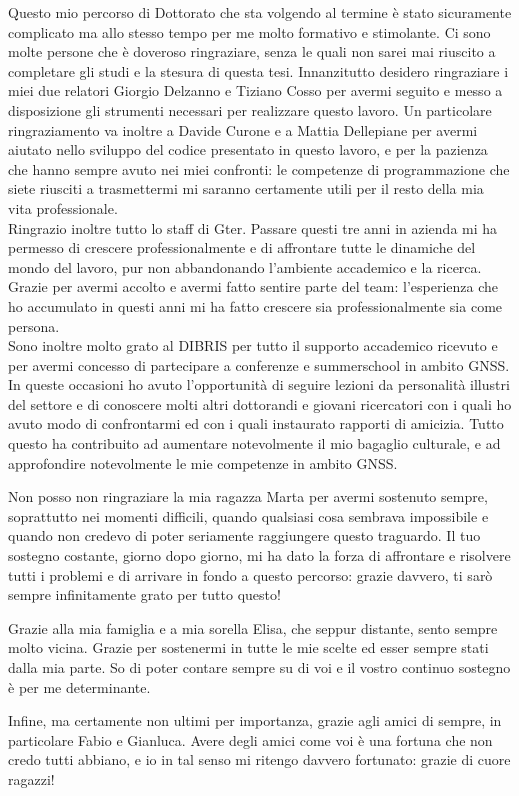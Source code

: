 \documentclass{disithesis}
\begin{document}
\begin{acknowledgements}
Questo mio percorso di Dottorato che sta volgendo al termine è stato sicuramente complicato ma allo stesso tempo per me molto formativo e stimolante. Ci sono molte persone che è doveroso ringraziare, senza le quali non sarei mai riuscito a completare gli studi e la stesura di questa tesi. Innanzitutto desidero ringraziare i miei due relatori Giorgio Delzanno e Tiziano Cosso per avermi seguito e messo a disposizione gli strumenti necessari per realizzare questo lavoro. Un particolare ringraziamento va inoltre a Davide Curone e a Mattia Dellepiane per avermi aiutato nello sviluppo del codice presentato in questo lavoro, e per la pazienza che hanno sempre avuto nei miei confronti: le competenze di programmazione che siete riusciti a trasmettermi mi saranno certamente utili per il resto della mia vita professionale.\\
Ringrazio inoltre tutto lo staff di Gter. Passare questi tre anni in azienda mi ha permesso di crescere professionalmente e di affrontare tutte le dinamiche del mondo del lavoro, pur non abbandonando l'ambiente accademico e la ricerca. Grazie per avermi accolto e avermi fatto sentire parte del team: l'esperienza che ho accumulato in questi anni mi ha fatto crescere sia professionalmente sia come persona. \\
Sono inoltre molto grato al DIBRIS per tutto il supporto accademico ricevuto e per avermi concesso di partecipare a conferenze e summerschool in ambito GNSS. In queste occasioni ho avuto l'opportunità di seguire lezioni da personalità illustri del settore e di conoscere molti altri dottorandi e giovani ricercatori con i quali ho avuto modo di confrontarmi ed con i quali instaurato rapporti di amicizia. Tutto questo ha contribuito ad aumentare notevolmente il mio bagaglio culturale, e ad approfondire notevolmente le mie competenze in ambito GNSS.

Non posso non ringraziare la mia ragazza Marta per avermi sostenuto sempre, soprattutto nei momenti difficili, quando qualsiasi cosa sembrava impossibile e quando non credevo di poter seriamente raggiungere questo traguardo. Il tuo sostegno costante, giorno dopo giorno, mi ha dato la forza di affrontare e risolvere tutti i problemi e di arrivare in fondo a questo percorso: grazie davvero, ti sarò sempre infinitamente grato per tutto questo! 

Grazie alla mia famiglia e a mia sorella Elisa, che seppur distante, sento sempre molto vicina. Grazie per sostenermi in tutte le mie scelte ed esser sempre stati dalla mia parte. So di poter contare sempre su di voi e il vostro continuo sostegno è per me determinante.

Infine, ma certamente non ultimi per importanza, grazie agli amici di sempre, in particolare Fabio e Gianluca. Avere degli amici come voi è una fortuna che non credo tutti abbiano, e io in tal senso mi ritengo davvero fortunato: grazie di cuore ragazzi!

\end{acknowledgements}
\end{document}

